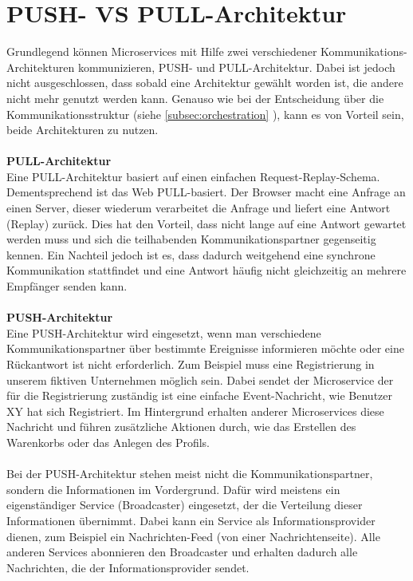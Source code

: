 \section{PUSH- VS PULL-Architektur}
\label{sec:PushPullArchitektur}
Grundlegend können Microservices mit Hilfe zwei verschiedener Kommunikations-Architekturen kommunizieren, PUSH- und PULL-Architektur. Dabei ist jedoch nicht ausgeschlossen, dass sobald eine Architektur gewählt worden ist, die andere nicht mehr genutzt werden kann. Genauso wie bei der Entscheidung über die Kommunikationsstruktur (siehe \ref{subsec:orchestration} ), kann es von Vorteil sein, beide Architekturen zu nutzen.
\\\\
\textbf{PULL-Architektur}\\
Eine PULL-Architektur basiert auf einen einfachen Request-Replay-Schema. Dementsprechend ist das Web PULL-basiert.
Der Browser macht eine Anfrage an einen Server, dieser wiederum verarbeitet die Anfrage und liefert eine Antwort (Replay) zurück. Dies hat den Vorteil, dass nicht lange auf eine Antwort gewartet werden muss und sich die teilhabenden Kommunikationspartner gegenseitig kennen. Ein Nachteil jedoch ist es, dass dadurch weitgehend eine synchrone Kommunikation stattfindet und eine Antwort häufig nicht gleichzeitig an mehrere Empfänger senden kann.
\\\\
\textbf{PUSH-Architektur}\\
Eine PUSH-Architektur wird eingesetzt, wenn man verschiedene Kommunikationspartner über bestimmte Ereignisse informieren möchte oder eine Rückantwort ist nicht erforderlich. Zum Beispiel muss eine Registrierung in unserem fiktiven Unternehmen möglich sein. Dabei sendet der Microservice der für die Registrierung zuständig ist eine einfache Event-Nachricht, wie Benutzer XY hat sich Registriert. Im Hintergrund erhalten anderer Microservices diese Nachricht und führen zusätzliche Aktionen durch, wie das Erstellen des Warenkorbs oder das Anlegen des Profils.
\\\\
Bei der PUSH-Architektur stehen meist nicht die Kommunikationspartner, sondern die Informationen im Vordergrund. Dafür wird meistens ein eigenständiger Service (Broadcaster) eingesetzt, der die Verteilung dieser Informationen übernimmt. Dabei kann ein Service als Informationsprovider dienen, zum Beispiel ein Nachrichten-Feed (von einer Nachrichtenseite). Alle anderen Services abonnieren den Broadcaster und erhalten dadurch alle Nachrichten, die der Informationsprovider sendet.
